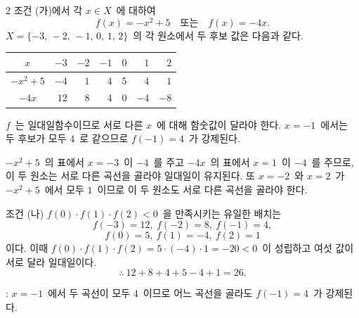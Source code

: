 \documentclass[10pt,fleqn]{article}
\begin{document}
\begin{multicols*}{2}
조건 (가)에서 각 $x \in X$\ 에 대하여
\[ f(x) = -x^{2} + 5 \quad \text{또는} \quad f(x) = -4x. \]
$X = \{-3,\, -2,\, -1,\, 0,\, 1,\, 2\}$\ 의 각 원소에서 두 후보 값은 다음과 같다.

\vspace{3mm}
\begin{center}
\begin{tabular}{c|rrrrrr}
$x$ & $-3$ & $-2$ & $-1$ & $0$ & $1$ & $2$ \\ \hline
$-x^{2} + 5$ & $-4$ & $1$ & $4$ & $5$ & $4$ & $1$ \\
$-4x$ & $12$ & $8$ & $4$ & $0$ & $-4$ & $-8$
\end{tabular}
\end{center}

\vspace{3mm}
$f$\ 는 일대일함수이므로 서로 다른 $x$\ 에 대해 함숫값이 달라야 한다. $x = -1$\ 에서는 두 후보가 모두 $4$\ 로 같으므로 $f(-1) = 4$\ 가 강제된다.

$-x^{2} + 5$\ 의 표에서 $x = -3$\ 이 $-4$\ 를 주고 $-4x$\ 의 표에서 $x = 1$\ 이 $-4$\ 를 주므로, 이 두 원소는 서로 다른 곡선을 골라야 일대일이 유지된다. 또 $x = -2$\ 와 $x = 2$\ 가 $-x^{2} + 5$\ 에서 모두 $1$\ 이므로 이 두 원소도 서로 다른 곡선을 골라야 한다.

조건 (나) $f(0) \cdot f(1) \cdot f(2) < 0$\ 을 만족시키는 유일한 배치는
\[ f(-3) = 12,\ f(-2) = 8,\ f(-1) = 4, \]
\[ f(0) = 5,\ f(1) = -4,\ f(2) = 1 \]
이다. 이때 $f(0) \cdot f(1) \cdot f(2) = 5 \cdot (-4) \cdot 1 = -20 < 0$\ 이 성립하고 여섯 값이 서로 달라 일대일이다.
\[ \therefore\ 12 + 8 + 4 + 5 - 4 + 1 = 26. \]

\begin{dmcriticalpoint}
: $x = -1$\ 에서 두 곡선이 모두 $4$\ 이므로 어느 곡선을 골라도 $f(-1) = 4$\ 가 강제된다.
\end{dmcriticalpoint}

\end{multicols*}
\end{document}
